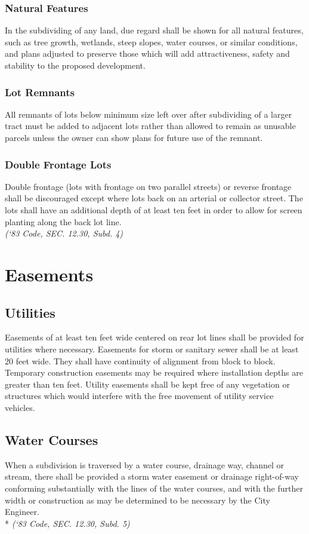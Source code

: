 \subsubsection{Natural Features}
In the subdividing of any land, due regard shall be shown for all natural features, such as tree growth, wetlands, steep slopes, water courses, or similar conditions, and plans adjusted to preserve those which will add attractiveness, safety and stability to the proposed development.
\subsubsection{Lot Remnants}
All remnants of lots below minimum size left over after subdividing of a larger tract must be added to adjacent lots rather than allowed to remain as unusable parcels unless the owner can show plans for future use of the remnant.
\subsubsection{Double Frontage Lots}
Double frontage (lots with frontage on two parallel streets) or reverse frontage shall be discouraged except where lots back on an arterial or collector street.  The lots shall have an additional depth of at least ten feet in order to allow for screen planting along the back lot line.\\
\emph{(‘83 Code, SEC. 12.30, Subd. 4)}

\section{Easements}
\subsection{Utilities}
Easements of at least ten feet wide centered on rear lot lines shall be provided for utilities where necessary. Easements for storm or sanitary sewer shall be at least 20 feet wide. They shall have continuity of alignment from block to block. Temporary construction easements may be required where installation depths are greater than ten feet. Utility easements shall be kept free of any vegetation or structures which would interfere with the free movement of utility service vehicles.
\subsection{Water Courses}
When a subdivision is traversed by a water course, drainage way, channel or stream, there shall be provided a storm water easement or drainage right-of-way conforming substantially with the lines of the water courses, and with the further width or construction as may be determined to be necessary by the City Engineer.\\*
\emph{(‘83 Code, SEC. 12.30, Subd. 5)}
